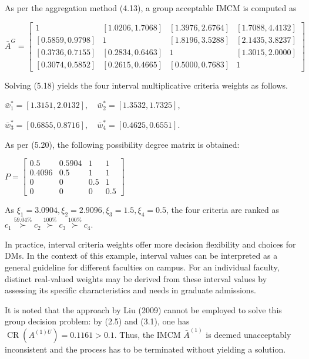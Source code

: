 \documentclass[10pt]{article}
\begin{document}
As per the aggregation method (4.13), a group acceptable IMCM is computed as

$$
\bar{A}^{G}=\left[\begin{array}{cccc}
1 & {[1.0206,1.7068]} & {[1.3976,2.6764]} & {[1.7088,4.4132]} \\
{[0.5859,0.9798]} & 1 & {[1.8196,3.5288]} & {[2.1435,3.8237]} \\
{[0.3736,0.7155]} & {[0.2834,0.6463]} & 1 & {[1.3015,2.0000]} \\
{[0.3074,0.5852]} & {[0.2615,0.4665]} & {[0.5000,0.7683]} & 1
\end{array}\right]
$$

Solving (5.18) yields the four interval multiplicative criteria weights as follows.

$\bar{w}_{1}^{*}=[1.3151,2.0132], \quad \bar{w}_{2}^{*}=[1.3532,1.7325]$,

$\bar{w}_{3}^{*}=[0.6855,0.8716], \quad \bar{w}_{4}^{*}=[0.4625,0.6551]$.

As per (5.20), the following possibility degree matrix is obtained:

$P=\left[\begin{array}{cccc}0.5 & 0.5904 & 1 & 1 \\ 0.4096 & 0.5 & 1 & 1 \\ 0 & 0 & 0.5 & 1 \\ 0 & 0 & 0 & 0.5\end{array}\right]$

As $\xi_{1}=3.0904, \xi_{2}=2.9096, \xi_{3}=1.5, \xi_{4}=0.5$, the four criteria are ranked as $c_{1} \stackrel{59.04 \%}{\succ} c_{2} \stackrel{100 \%}{\succ} c_{3} \stackrel{100 \%}{\succ} c_{4}$.

In practice, interval criteria weights offer more decision flexibility and choices for DMs. In the context of this example, interval values can be interpreted as a general guideline for different faculties on campus. For an individual faculty, distinct real-valued weights may be derived from these interval values by assessing its specific characteristics and needs in graduate admissions.

It is noted that the approach by Liu (2009) cannot be employed to solve this group decision problem: by (2.5) and (3.1), one has $\operatorname{CR}\left(A^{(1) U}\right)=0.1161>0.1$. Thus, the IMCM $\bar{A}^{(1)}$ is deemed unacceptably inconsistent and the process has to be terminated without yielding a solution.
\end{document}
